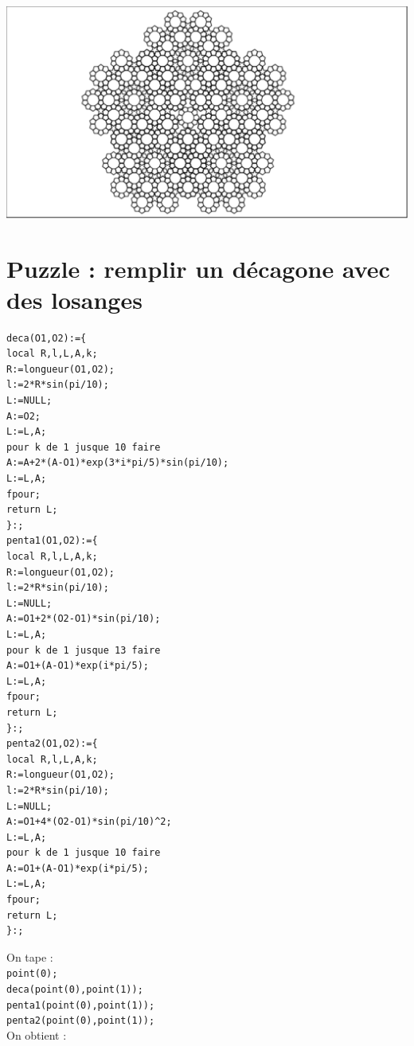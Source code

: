 \documentclass[a4paper,11pt]{book}
\begin{document}
\includegraphics[width=\textwidth]{quasicristal}
\section{Puzzle : remplir un d\'ecagone avec des losanges}
\begin{verbatim}
deca(O1,O2):={
local R,l,L,A,k;
R:=longueur(O1,O2);
l:=2*R*sin(pi/10);
L:=NULL;
A:=O2;
L:=L,A;
pour k de 1 jusque 10 faire
A:=A+2*(A-O1)*exp(3*i*pi/5)*sin(pi/10);
L:=L,A;
fpour;
return L;
}:;
penta1(O1,O2):={
local R,l,L,A,k;
R:=longueur(O1,O2);
l:=2*R*sin(pi/10);
L:=NULL;
A:=O1+2*(O2-O1)*sin(pi/10);
L:=L,A;
pour k de 1 jusque 13 faire
A:=O1+(A-O1)*exp(i*pi/5);
L:=L,A;
fpour;
return L;
}:;
penta2(O1,O2):={
local R,l,L,A,k;
R:=longueur(O1,O2);
l:=2*R*sin(pi/10);
L:=NULL;
A:=O1+4*(O2-O1)*sin(pi/10)^2;
L:=L,A;
pour k de 1 jusque 10 faire
A:=O1+(A-O1)*exp(i*pi/5);
L:=L,A;
fpour;
return L;
}:;
\end{verbatim}
On tape :\\
{\tt point(0);}\\
{\tt deca(point(0),point(1));}\\
{\tt penta1(point(0),point(1));}\\
{\tt penta2(point(0),point(1));}\\
On obtient :\\
\end{document}
